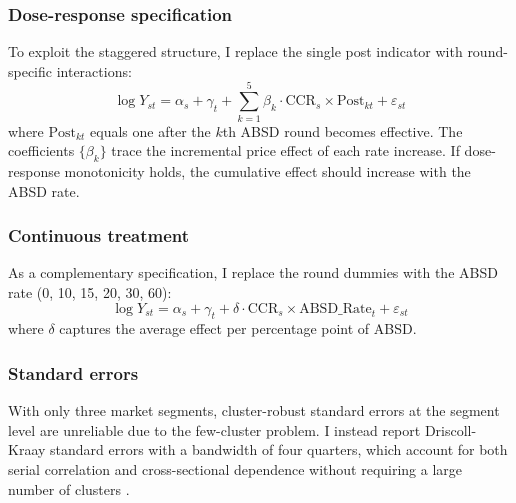 \documentclass[12pt]{article}
\begin{document}
\subsubsection*{Dose-response specification} To exploit the staggered structure, I replace the single post indicator with round-specific interactions:
\begin{equation}\label{eq:dose}
\log Y_{st} = \alpha_s + \gamma_t + \sum_{k=1}^{5} \beta_k \cdot \text{CCR}_s \times \text{Post}_{kt} + \varepsilon_{st}
\end{equation}
where $\text{Post}_{kt}$ equals one after the $k$th ABSD round becomes effective. The coefficients $\{\beta_k\}$ trace the incremental price effect of each rate increase. If dose-response monotonicity holds, the cumulative effect should increase with the ABSD rate.

\subsubsection*{Continuous treatment} As a complementary specification, I replace the round dummies with the ABSD rate (0, 10, 15, 20, 30, 60):
\begin{equation}\label{eq:cont}
\log Y_{st} = \alpha_s + \gamma_t + \delta \cdot \text{CCR}_s \times \text{ABSD\_Rate}_t + \varepsilon_{st}
\end{equation}
where $\delta$ captures the average effect per percentage point of ABSD.

\subsubsection*{Standard errors} With only three market segments, cluster-robust standard errors at the segment level are unreliable due to the few-cluster problem. I instead report Driscoll-Kraay standard errors with a bandwidth of four quarters, which account for both serial correlation and cross-sectional dependence without requiring a large number of clusters \citep{Driscoll1998}.
\end{document}
